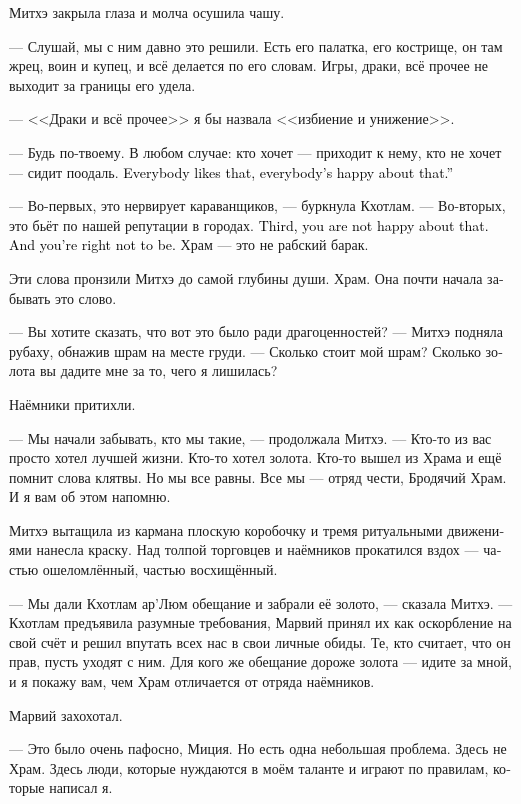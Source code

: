 \documentclass[a4paper,12pt,fleqn]{book}\usepackage{cooltooltips}\usepackage{polyglossia}\setdefaultlanguage{russian}\setotherlanguage{english}\defaultfontfeatures{Ligatures=TeX,Mapping=tex-text} \usepackage{xcolor}\definecolor{lightgray}{HTML}{bbbbbb}\color{lightgray}\newcommand{\ml}[3]{\textenglish{\textcolor{black}{#3}}}
\newcommand{\asterism}{\vspace{1em}{\centering\Large\bfseries$\ast~\ast~\ast$\par}\vspace{1em}}
\begin{document}
Митхэ закрыла глаза и молча осушила чашу.

--- Слушай, мы с ним давно это решили.
Есть его палатка, его кострище, он там жрец, воин и купец, и всё делается по его словам.
Игры, драки, всё прочее не выходит за границы его удела.

--- <<Драки и всё прочее>> я бы назвала <<избиение и унижение>>.

--- Будь по-твоему.
В любом случае: кто хочет --- приходит к нему, кто не хочет --- сидит поодаль.
\ml{$0$}
{Всем хорошо, все счастливы.}
{Everybody likes that, everybody's happy about that.''}

--- Во-первых, это нервирует караванщиков, --- буркнула Кхотлам.
--- Во-вторых, это бьёт по нашей репутации в городах.
\ml{$0$}
{В-третьих, тебе самой это не нравится.}
{Third, you are not happy about that.}
\ml{$0$}
{И правильно не нравится.}
{And you're right not to be.}
Храм --- это не рабский барак.

Эти слова пронзили Митхэ до самой глубины души.
Храм.
Она почти начала забывать это слово.

\asterism

--- Вы хотите сказать, что вот это было ради драгоценностей? --- Митхэ подняла рубаху, обнажив шрам на месте груди.
--- Сколько стоит мой шрам?
Сколько золота вы дадите мне за то, чего я лишилась?

Наёмники притихли.

--- Мы начали забывать, кто мы такие, --- продолжала Митхэ.
--- Кто-то из вас просто хотел лучшей жизни.
Кто-то хотел золота.
Кто-то вышел из Храма и ещё помнит слова клятвы.
Но мы все равны.
Все мы --- отряд чести, Бродячий Храм.
И я вам об этом напомню.

Митхэ вытащила из кармана плоскую коробочку и тремя ритуальными движениями нанесла краску.
Над толпой торговцев и наёмников прокатился вздох --- частью ошеломлённый, частью восхищённый.

--- Мы дали Кхотлам ар'Люм обещание и забрали её золото, --- сказала Митхэ.
--- Кхотлам предъявила разумные требования, Марвий принял их как оскорбление на свой счёт и решил впутать всех нас в свои личные обиды.
Те, кто считает, что он прав, пусть уходят с ним.
Для кого же обещание дороже золота --- идите за мной, и я покажу вам, чем Храм отличается от отряда наёмников.

Марвий захохотал.

--- Это было очень пафосно, Миция.
Но есть одна небольшая проблема.
Здесь не Храм.
Здесь люди, которые нуждаются в моём таланте и играют по правилам, которые написал я.
\end{document}
